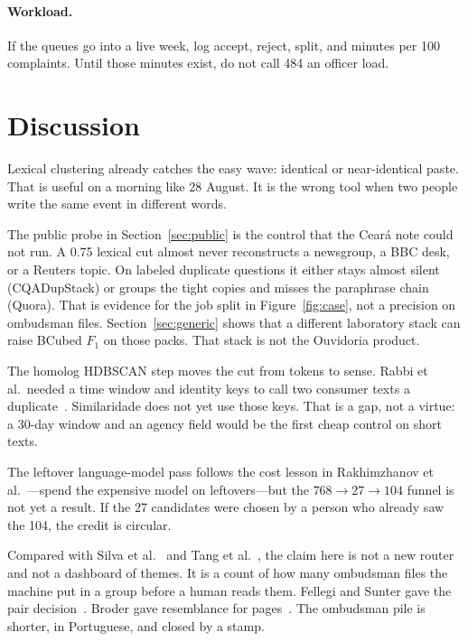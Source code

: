 \documentclass[acmlarge,screen]{acmart}
\begin{document}
\paragraph{Workload.} If the queues go into a live week, log accept, reject, split, and minutes per 100 complaints. Until those minutes exist, do not call 484 an officer load.

\section{Discussion}

Lexical clustering already catches the easy wave: identical or near-identical paste. That is useful on a morning like 28 August. It is the wrong tool when two people write the same event in different words.

The public probe in Section~\ref{sec:public} is the control that the Cear\'{a} note could not run. A 0.75 lexical cut almost never reconstructs a newsgroup, a BBC desk, or a Reuters topic. On labeled duplicate questions it either stays almost silent (CQADupStack) or groups the tight copies and misses the paraphrase chain (Quora). That is evidence for the job split in Figure~\ref{fig:case}, not a precision on ombudsman files. Section~\ref{sec:generic} shows that a different laboratory stack can raise BCubed $F_1$ on those packs. That stack is not the Ouvidoria product.

The homolog HDBSCAN step moves the cut from tokens to sense. Rabbi et al.\ needed a time window and identity keys to call two consumer texts a duplicate~\cite{rabbi2026duplicate}. Similaridade does not yet use those keys. That is a gap, not a virtue: a 30-day window and an agency field would be the first cheap control on short texts.

The leftover language-model pass follows the cost lesson in Rakhimzhanov et al.~\cite{rakhimzhanov2025transport}---spend the expensive model on leftovers---but the $768 \rightarrow 27 \rightarrow 104$ funnel is not yet a result. If the 27 candidates were chosen by a person who already saw the 104, the credit is circular.

Compared with Silva et al.~\cite{silva2026bridging} and Tang et al.~\cite{tang2024bertopic}, the claim here is not a new router and not a dashboard of themes. It is a count of how many ombudsman files the machine put in a group before a human reads them. Fellegi and Sunter gave the pair decision~\cite{fellegi1969linkage}. Broder gave resemblance for pages~\cite{broder1997resemblance}. The ombudsman pile is shorter, in Portuguese, and closed by a stamp.
\end{document}
